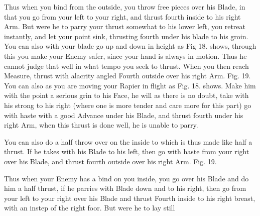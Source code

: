 Thus when you bind from the outside, you throw free pieces over his
Blade, in that you go from your left to your right, and thrust fourth
inside to his right Arm. But were he to parry your thrust somewhat to
his lower left, you retreat instantly, and let your point sink,
thrusting fourth under his blade to his groin. You can also with your
blade go up and down in height as Fig 18. shows, through this you make
your Enemy safer,
since your hand is always in motion. Thus he cannot judge that well in
what tempo you seek to thrust. When you then reach Measure, thrust
with alacrity angled Fourth outside over his right Arm. Fig. 19. You
can also as you are moving your Rapier in flight as
Fig. 18. shows. Make him with the point a serious grin to his Face, he
will as there is no doubt, take with his strong to his right (where
one is more tender and care more for this part) go with haste with a
good Advance under his Blade, and thrust fourth under his right Arm,
when this thrust is done well, he is unable to parry.

\exercise{}


You can also do a half throw over on the inside to which is thus made
like half a thrust. If he takes with his Blade to his left, then go
with haste from your right over his Blade, and thrust fourth outside
over his right Arm. Fig. 19.

\exercise{}


Thus when your Enemy has a bind on you inside, you go over his Blade
and do him a half thrust, if he parries with Blade down and to his
right, then go from your left to your right over his Blade and thrust
Fourth inside to his right breast, with an instep of the right
foor. But were he to lay still
